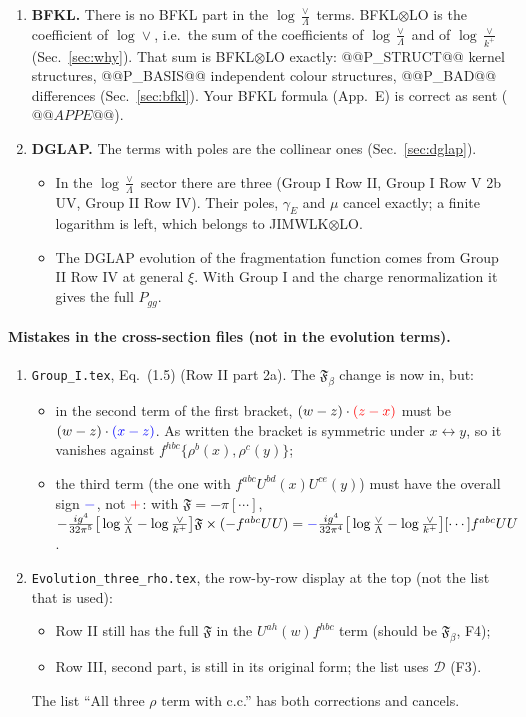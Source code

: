 \documentclass[10pt]{article}
\numberwithin{equation}{section}
\newcommand{\new}[1]{{\color{blue}#1}}
\newcommand{\old}[1]{{\color{red}#1}}
\begin{document}
\begin{enumerate}
\item \textbf{BFKL.} There is no BFKL part in the $\log\frac{\vee}{\Lambda}$ terms. BFKL$\otimes$LO is the coefficient of $\log\vee$, i.e.\ the sum of the coefficients of $\log\frac{\vee}{\Lambda}$ and of $\log\frac{\vee}{k^+}$ (Sec.~\ref{sec:why}). That sum is BFKL$\otimes$LO exactly: @@P_STRUCT@@ kernel structures, @@P_BASIS@@ independent colour structures, @@P_BAD@@ differences (Sec.~\ref{sec:bfkl}). Your BFKL formula (App.~E) is correct as sent ($@@APPE@@$).
\item \textbf{DGLAP.} The terms with poles are the collinear ones (Sec.~\ref{sec:dglap}).
\begin{itemize}
\item In the $\log\frac{\vee}{\Lambda}$ sector there are three (Group I Row II, Group I Row V 2b UV, Group II Row IV). Their poles, $\gamma_E$ and $\mu$ cancel exactly; a finite logarithm is left, which belongs to JIMWLK$\otimes$LO.
\item The DGLAP evolution of the fragmentation function comes from Group II Row IV at general $\xi$. With Group I and the charge renormalization it gives the full $P_{gg}$.
\end{itemize}
\end{enumerate}

\paragraph{Mistakes in the cross-section files (not in the evolution terms).}
\begin{enumerate}
\item[\textbf{M3}] \texttt{Group\_I.tex}, Eq.~(1.5) (Row II part 2a). The $\mathfrak F_\beta$ change is now in, but:
\begin{itemize}
\item in the second term of the first bracket, $(w-z)\cdot\old{(z-x)}$ must be $(w-z)\cdot\new{(x-z)}$. As written the bracket is symmetric under $x\leftrightarrow y$, so it vanishes against $f^{hbc}\{\rho^b(x),\rho^c(y)\}$;
\item the third term (the one with $f^{abc}U^{bd}(x)U^{ce}(y)$) must have the overall sign $\new{-}$, not $\old{+}$: with $\mathfrak F=-\pi[\cdots]$, $-\frac{ig^4}{32\pi^5}\big[\log\frac{\vee}{\Lambda}-\log\frac{\vee}{k^+}\big]\mathfrak F\times(-f^{abc}UU)=\new{-}\frac{ig^4}{32\pi^4}\big[\log\frac{\vee}{\Lambda}-\log\frac{\vee}{k^+}\big][\cdots]f^{abc}UU$.
\end{itemize}
\item[\textbf{M4}] \texttt{Evolution\_three\_rho.tex}, the row-by-row display at the top (not the list that is used):
\begin{itemize}
\item Row II still has the full $\mathfrak F$ in the $U^{ah}(w)f^{hbc}$ term (should be $\mathfrak F_\beta$, F4);
\item Row III, second part, is still in its original form; the list uses $\mathcal D$ (F3).
\end{itemize}
The list ``All three $\rho$ term with c.c.'' has both corrections and cancels.
\end{enumerate}
\end{document}

